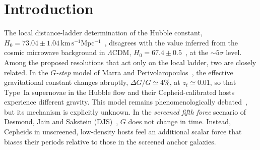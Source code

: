\documentclass[aps,prd,reprint,superscriptaddress,nofootinbib,floatfix]{revtex4-2}
\theoremstyle{definition}
\begin{document}
\maketitle

\section{Introduction}

The local distance-ladder determination of the Hubble constant, $H_0 = 73.04\pm1.04\,\mathrm{km\,s^{-1}Mpc^{-1}}$~\cite{Riess2022}, disagrees with the value inferred from the cosmic microwave background in $\Lambda$CDM, $H_0=67.4\pm0.5$~\cite{Planck2018}, at the $\sim\!5\sigma$ level. Among the proposed resolutions that act only on the local ladder, two are closely related. In the \emph{$G$-step} model of Marra and Perivolaropoulos~\cite{MarraPerivolaropoulos2021}, the effective gravitational constant changes abruptly, $\Delta G/G \simeq 4\%$, at $z_t\simeq0.01$, so that Type~Ia supernovae in the Hubble flow and their Cepheid-calibrated hosts experience different gravity. This model remains phenomenologically debated~\cite{PerivolaropoulosRuchika2025,EfstratiouPerivolaropoulos2025}, but its mechanism is explicitly unknown. In the \emph{screened fifth force} scenario of Desmond, Jain and Sakstein (DJS)~\cite{DJS2019}, $G$ does not change in time. Instead, Cepheids in unscreened, low-density hosts feel an additional scalar force that biases their periods relative to those in the screened anchor galaxies.
\end{document}
